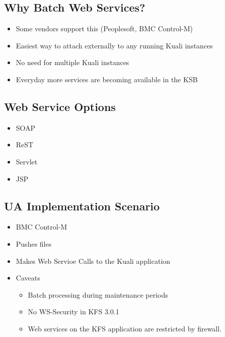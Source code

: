 \documentclass[12pt,notitlepage]{article}
\begin{document}
\begin{s5presentation}
%
%
  \W \begin{s5slide}
    \section{Why Batch Web Services? }
    \begin{itemize}
      \item Some vendors support this (Peoplesoft, BMC Control-M)
      \item Easiest way to attach externally to any running Kuali instances
      \item No need for multiple Kuali instances
      \item Everyday more services are becoming available in the KSB
    \end{itemize}
    
  \W \end{s5slide}

%
%
  \W \begin{s5slide}
    \section{Web Service Options }
    \begin{itemize}
      \item SOAP
      \item ReST
      \item Servlet
      \item JSP
    \end{itemize}
    
  \W \end{s5slide}

%
%
  \W \begin{s5slide}
    \section{UA Implementation Scenario }
    \begin{itemize}
      \item BMC Control-M
      \item Pushes files
      \item Makes Web Servioe Calls to the Kuali application
      \item Caveats
        \begin{itemize}
        \item Batch processing during maintenance periods
        \item No WS-Security in KFS 3.0.1
        \item Web services on the KFS application are restricted by firewall.
        \end{itemize}
    \end{itemize}
    

\end{s5slide}
\end{s5presentation}
\end{document}
